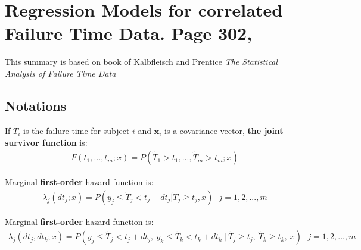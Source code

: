 \documentclass[]{article}
\begin{document}
\section{Regression Models for correlated Failure Time Data. Page 302, \cite{kalbfleisch2011statistical}}
This summary is based on book of Kalbfleisch and Prentice \emph{The Statistical Analysis of Failure Time Data}

\subsection{Notations}
If $\tilde{T}_i$ is the failure time for subject $i$ and $\pmb{x}_i$ is a covariance vector, \textbf{the joint survivor function} is:
	$$
	\begin{aligned}
		F(t_1,...,t_m;x) = P(\tilde{T}_1>t_1,...,\tilde{T}_m > t_m;x)
	\end{aligned}
	$$

Marginal \textbf{first-order }hazard function is:
	$$
	\begin{aligned}
		 \lambda_j(dt_j;x) = P(y_j\leq \tilde{T}_j<t_j + dt_j|\tilde{T}_j \geq t_j,x) ~~~j=1,2,...,m
	\end{aligned}
	$$

Marginal \textbf{first-order }hazard function is:
	$$
	\begin{aligned}
		 \lambda_j(dt_j,dt_k;x) = P(y_j\leq \tilde{T}_j<t_j + dt_j,~y_k\leq \tilde{T}_k<t_k + dt_k~|~\tilde{T}_j \geq t_j,~\tilde{T}_k \geq t_k,~x) ~~~j=1,2,...,m
	\end{aligned}
	$$
\end{document}
